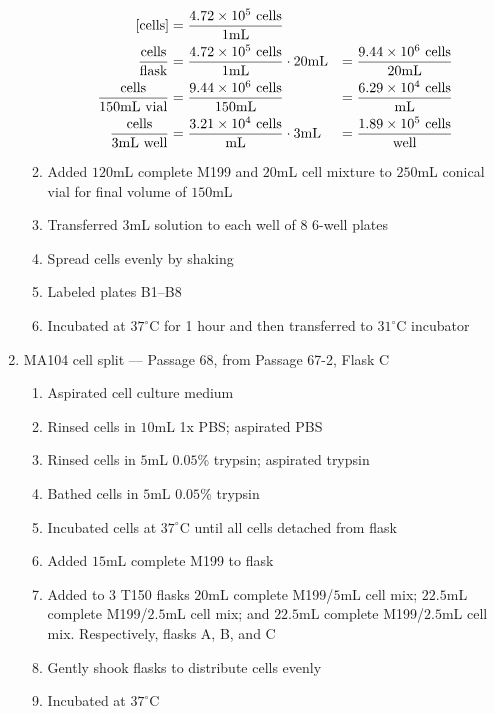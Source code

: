 \begin{enumerate}
\begin{enumerate}
					\begin{align*}
					\text{[cells]} &= \frac{4.72\times 10^{5}\text{ cells}}{1\text{mL}} \\
					\frac{\text{cells}}{\text{flask}} &= \frac{4.72\times 10^{5}\text{ cells}}{1\text{mL}} \cdot 20\text{mL} &= \frac{9.44\times 10^{6}\text{ cells}}{20\text{mL}}\\
					\frac{\text{cells}}{150\text{mL vial}} &= \frac{9.44\times 10^{6}\text{ cells}}{150\text{mL}} &= \frac{6.29\times 10^{4}\text{ cells}}{\text{mL}}\\
					\frac{\text{cells}}{3\text{mL well}} &= \frac{3.21\times 10^{4}\text{ cells}}{\text{mL}} \cdot 3\text{mL} &= \frac{1.89\times 10^{5}\text{ cells}}{\text{well}}\\
					\end{align*}
				\item Added $120$mL complete M199 and $20$mL cell mixture to $250$mL conical vial for final volume of $150$mL
				\item Transferred $3$mL solution to each well of 8 6-well plates
				\item Spread cells evenly by shaking
				\item Labeled plates B1--B8
				\item Incubated at $37^{\circ}$C for 1 hour and then transferred to $31^{\circ}$C incubator
		\end{enumerate}
	\item MA104 cell split --- Passage 68, from Passage 67-2, Flask C
			\begin{enumerate}
				\item Aspirated cell culture medium
				\item Rinsed cells in $10$mL 1x PBS; aspirated PBS
				\item Rinsed cells in $5$mL $0.05$\% trypsin; aspirated trypsin
				\item Bathed cells in $5$mL $0.05$\% trypsin
				\item Incubated cells at $37^{\circ}$C until all cells detached from flask
				\item Added $15$mL complete M199 to flask
				\item Added to $3$ T150 flasks $20$mL complete M199/$5$mL cell mix; $22.5$mL complete M199/$2.5$mL cell mix; and $22.5$mL complete M199/$2.5$mL cell mix. Respectively, flasks A, B, and C
				\item Gently shook flasks to distribute cells evenly
				\item Incubated at $37^{\circ}$C
			\end{enumerate}
\end{enumerate}